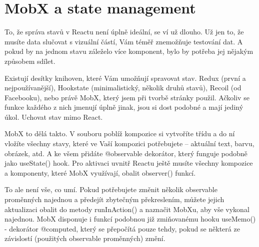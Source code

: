 \section{MobX a state management}

To, že správa stavů v Reactu není úplně ideální, se ví už dlouho. Už jen to, že musíte data slučovat s vizuální částí, Vám téměř znemožňuje testování dat. A pokud by na jednom stavu záleželo více komponent, bylo by potřeba jej nějakým způsobem sdílet.

Existují desítky knihoven\cite{StateManagementLibs}, které Vám umožňují spravovat stav. Redux (první a nejpoužívanější), Hookstate (minimalistický, několik druhů stavů), Recoil (od Facebooku), nebo právě MobX, který jsem při tvorbě stránky použil. Ačkoliv se funkce každého z nich jmenují úplně jinak, jsou si dost podobné a mají jediný úkol. Uchovat stav mimo React.

MobX to dělá takto. V souboru poblíž kompozice si vytvoříte třídu a do ní vložíte všechny stavy, které ve Vaší kompozici potřebujete – aktuální text, barvu, obrázek, atd. A ke všem přidáte @observable dekorátor, který funguje podobně jako useState() hook. Pro aktivaci uvnitř Reactu ještě musíte všechny kompozice a komponenty, které MobX využívají, obalit observer() funkcí.

To ale není vše, co umí. Pokud potřebujete změnit několik observable proměnných najednou a předejít zbytečným překreslením, můžete jejich aktualizaci obalit do metody runInAction() a naznačit MobXu, aby vše vykonal najednou. MobX disponuje i funkcí podobnou již zmiňovanému hooku useMemo() - dekorátor @computed\cite{MobXComputed}, který se přepočítá pouze tehdy, pokud se některá ze závislostí (použitých observable proměnných) změní.